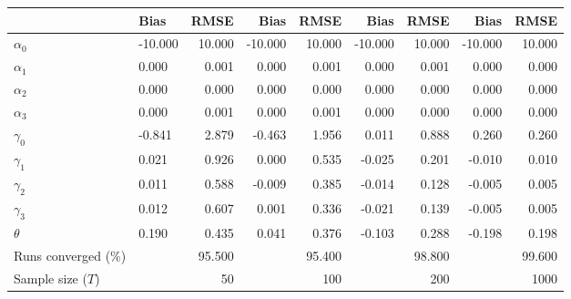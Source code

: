 
\begin{tabular}[t]{llrrrrrrr}
\toprule
  & Bias & RMSE & Bias & RMSE & Bias & RMSE & Bias & RMSE\\
\midrule
$\alpha_{0}$ & -10.000 & 10.000 & -10.000 & 10.000 & -10.000 & 10.000 & -10.000 & 10.000\\
$\alpha_{1}$ & 0.000 & 0.001 & 0.000 & 0.001 & 0.000 & 0.001 & 0.000 & 0.000\\
$\alpha_{2}$ & 0.000 & 0.000 & 0.000 & 0.000 & 0.000 & 0.000 & 0.000 & 0.000\\
$\alpha_{3}$ & 0.000 & 0.001 & 0.000 & 0.001 & 0.000 & 0.000 & 0.000 & 0.000\\
$\gamma_{0}$ & -0.841 & 2.879 & -0.463 & 1.956 & 0.011 & 0.888 & 0.260 & 0.260\\
$\gamma_{1}$ & 0.021 & 0.926 & 0.000 & 0.535 & -0.025 & 0.201 & -0.010 & 0.010\\
$\gamma_{2}$ & 0.011 & 0.588 & -0.009 & 0.385 & -0.014 & 0.128 & -0.005 & 0.005\\
$\gamma_{3}$ & 0.012 & 0.607 & 0.001 & 0.336 & -0.021 & 0.139 & -0.005 & 0.005\\
$\theta$ & 0.190 & 0.435 & 0.041 & 0.376 & -0.103 & 0.288 & -0.198 & 0.198\\
Runs converged (\%) &  & 95.500 &  & 95.400 &  & 98.800 &  & 99.600\\
Sample size ($T$) &  & 50 &  & 100 &  & 200 &  & 1000\\
\bottomrule
\end{tabular}

